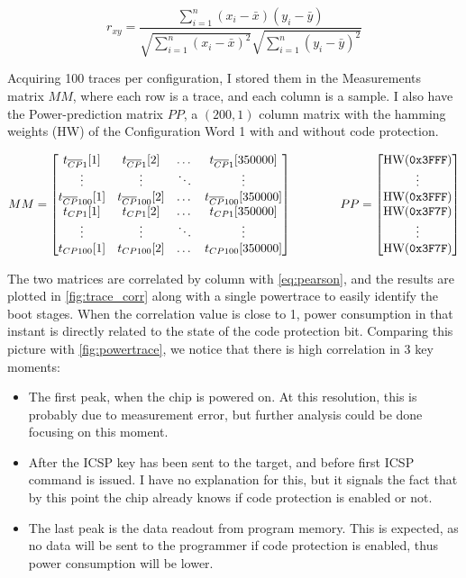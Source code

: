 \documentclass[a4paper,english,twoside,10pt]{article}
\begin{document}
\begin{equation}\label{eq:pearson}
	r_{xy} =\frac{\sum ^n _{i=1}(x_i - \bar{x})(y_i - \bar{y})}{\sqrt{\sum ^n _{i=1}(x_i - \bar{x})^2} \sqrt{\sum ^n _{i=1}(y_i - \bar{y})^2}}
\end{equation}

Acquiring 100 traces per configuration, I stored them in the Measurements matrix \(MM\), where each row is a trace, and each column is a sample. I also have the Power-prediction matrix \(PP\), a \((200, 1)\) column matrix with the hamming weights (HW) of the Configuration Word 1 with and without code protection.

\[
MM = 
\begin{bmatrix}
	t_{\overline{\footnotesize CP}1}[1] & t_{\overline{\footnotesize CP}1}[2] & \dots & t_{\overline{\footnotesize CP}1}[350000] \\
	\vdots & \vdots & \ddots & \vdots \\
	t_{\overline{\footnotesize CP}100}[1] & t_{\overline{\footnotesize CP}100}[2] & \dots & t_{\overline{\footnotesize CP}100}[350000] \\
	t_{\footnotesize CP1}[1] & t_{\footnotesize CP1}[2] & \dots & t_{\footnotesize CP1}[350000] \\
	\vdots & \vdots & \ddots & \vdots \\
	t_{\footnotesize CP100}[1] & t_{\footnotesize CP100}[2] & \dots & t_{\footnotesize CP100}[350000]
\end{bmatrix}
\qquad \qquad
PP =
\begin{bmatrix}
	\text{HW}(\mbox{\texttt{0x3FFF}}) \\
	\vdots \\
	\text{HW}(\mbox{\texttt{0x3FFF}}) \\
	\text{HW}(\mbox{\texttt{0x3F7F}}) \\
	\vdots \\
	\text{HW}(\mbox{\texttt{0x3F7F}})
\end{bmatrix}
\]

The two matrices are correlated by column with \cref{eq:pearson}, and the results are plotted in \cref{fig:trace_corr} along with a single powertrace to easily identify the boot stages. When the correlation value is close to 1, power consumption in that instant is directly related to the state of the code protection bit. Comparing this picture with \cref{fig:powertrace}, we notice that there is high correlation in 3 key moments:
\begin{itemize}
	\item The first peak, when the chip is powered on. At this resolution, this is probably due to measurement error, but further analysis could be done focusing on this moment.
	\item After the ICSP key has been sent to the target, and before first ICSP command is issued. I have no explanation for this, but it signals the fact that by this point the chip already knows if code protection is enabled or not.
	\item The last peak is the data readout from program memory. This is expected, as no data will be sent to the programmer if code protection is enabled, thus power consumption will be lower.
\end{itemize}
\end{document}
